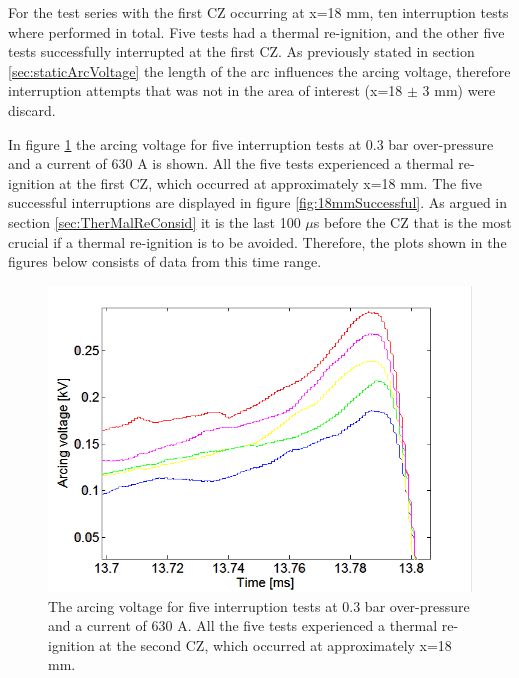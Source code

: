 \documentclass[10pt,b5paper,twoside]{article}
\begin{document}
For the test series with the first CZ occurring at x=18 mm, ten interruption tests where performed in total. Five tests had a thermal re-ignition, and the other five tests successfully interrupted at the first CZ. As previously stated in section \ref{sec:staticArcVoltage} the length of the arc influences the arcing voltage, therefore interruption attempts that was not in the area of interest (x=18 $\pm$ 3 mm) were discard.

In figure \ref{fig:18mmUnSuccessful} the arcing voltage for five interruption tests at 0.3 bar over-pressure and a current of 630 A is shown. All the five tests experienced a thermal re-ignition at the first CZ, which occurred at approximately  x=18 mm. The five successful interruptions are displayed in figure \ref{fig:18mmSuccessful}. As argued in section \ref{sec:TherMalReConsid} it is the last 100 $\mu$s before the CZ that is the most crucial if a thermal re-ignition is to be avoided. Therefore, the plots shown in the figures below consists of data from this time range. 

\begin{figure}[H]
\centering
\includegraphics[scale=0.6, angle =0 ]{Bilder/Results/ArcingVoltage_18_reIgnition.PNG}
\caption{The arcing voltage for five interruption tests at 0.3 bar over-pressure and a current of 630 A. All the five tests experienced a thermal re-ignition at the second CZ, which occurred at approximately  x=18 mm.} \label{fig:18mmUnSuccessful}
\end{figure}
\end{document}
